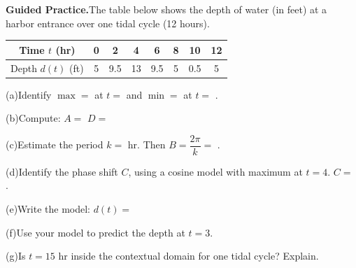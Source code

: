 \documentclass[10pt]{article}
\begin{document}
\begin{practicebox}

\textbf{Guided Practice.}\quad The table below shows the depth of water (in feet)
at a harbor entrance over one tidal cycle (12 hours).

\vspace{4pt}
\begin{center}
\renewcommand{\arraystretch}{1.35}
\begin{tabular}{|c|c|c|c|c|c|c|c|}
\hline
Time $t$ (hr) & 0 & 2 & 4 & 6 & 8 & 10 & 12 \\
\hline
Depth $d(t)$ (ft) & 5 & 9.5 & 13 & 9.5 & 5 & 0.5 & 5 \\
\hline
\end{tabular}
\end{center}

\vspace{4pt}
(a)\quad Identify $\max = $ \underline{\hspace{1.5cm}} at $t = $ \underline{\hspace{1cm}}
and $\min = $ \underline{\hspace{1.5cm}} at $t = $ \underline{\hspace{1cm}}.

\vspace{4pt}
(b)\quad Compute: $A = $ \underline{\hspace{2.5cm}} \quad $D = $ \underline{\hspace{2.5cm}}

\vspace{4pt}
(c)\quad Estimate the period $k = $ \underline{\hspace{1.5cm}} hr. \quad Then $B = \dfrac{2\pi}{k} = $ \underline{\hspace{2.5cm}}.

\vspace{4pt}
(d)\quad Identify the phase shift $C$, using a cosine model with maximum at $t = 4$. $C = $ \underline{\hspace{1.5cm}}.

\vspace{4pt}
(e)\quad Write the model: $d(t) = $ \underline{\hspace{7cm}}

\vspace{4pt}
(f)\quad Use your model to predict the depth at $t = 3$. \writeline

\vspace{4pt}
(g)\quad Is $t = 15$ hr inside the contextual domain for one tidal cycle? Explain.

\end{practicebox}
\end{document}
